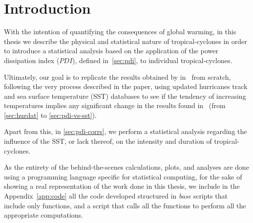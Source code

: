 \section{Introduction}

With the intention of quantifying the consequences of global warming, in this thesis we describe the physical and statistical nature of tropical-cyclones in order to introduce a statistical analysis based on the application of the power dissipation index ($PDI$), defined in~\cref{sec:pdi},
to individual tropical-cyclones.

Ultimately, our goal is to replicate the results obtained by \citeauthor{Corral2010} in~\cite{Corral2010} from scratch, following the very process described in the paper, using updated hurricanes track and sea surface temperature (SST) databases to see if the tendency of increasing temperatures implies any significant change in the results found in~\cite{Corral2010} (from \cref{sec:hurdat} to \cref{sec:pdi-vs-sst}).

Apart from this, in \cref{sec:pdi-corrs}, we perform a statistical analysis regarding the influence of the SST, or lack thereof, on the intensity and duration of tropical-cyclones.

\sk
As the entirety of the behind-the-scenes calculations, plots, and analyses are done using a programming language specific for statistical computing, for the sake of showing a real representation of the work done in this thesis, we include in the Appendix~\ref{app:code} all the code developed structured in \emph{base} scripts that include only functions, and a  script that calls all the functions to perform all the appropriate computations.


